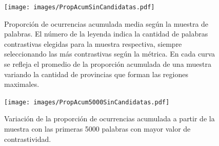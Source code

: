 





\begin{figure}[ht]\centering
    \texttt{[image: images/PropAcumSinCandidatas.pdf]}
    \caption{Proporción de ocurrencias acumulada media según la muestra de palabras. El número de la leyenda indica la cantidad de palabras contrastivas elegidas para la muestra respectiva, siempre seleccionando las más contrastivas según la métrica. En cada curva se refleja el promedio de la proporción acumulada de una muestra variando la cantidad de provincias que forman las regiones maximales.} 
    \label{fig:propAcum} 
\end{figure}


\begin{figure}[h]\centering
    \texttt{[image: images/PropAcum5000SinCandidatas.pdf]}
    \caption{Variación de la proporción de ocurrencias acumulada a partir de la muestra con las primeras 5000 palabras con mayor valor de contrastividad.} 
    \label{fig:propAcum5000} 
\end{figure}

